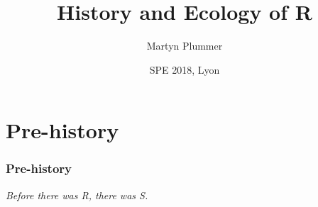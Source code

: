 \documentclass[svgnames]{beamer}
\title[R history] %
{History and Ecology of R}
\subtitle
{} %
\author %
{Martyn Plummer}
\institute[IARC] %
{
  International Agency for\\Research on Cancer
}
\date %
{SPE 2018, Lyon}
\begin{document}
\begin{frame}[plain]
  \titlepage
\end{frame}





\section{Pre-history}

\begin{frame}
  \frametitle{Pre-history}

  \begin{center}
  {\em Before there was R, there was S.}
  \end{center}
  
\end{frame}
\end{document}
